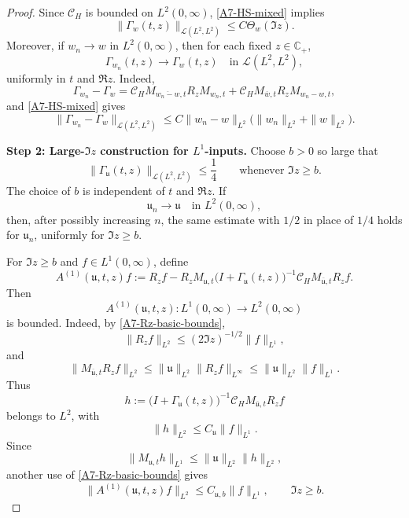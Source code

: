 \documentclass[10pt,a4paper]{amsart}
\begin{document}
\begin{proof}
Since \(\mathcal C_H\) is bounded on \(L^2(0,\infty)\), \eqref{A7-HS-mixed}
implies
\begin{equation}
\label{A7-Gamma-HS-bound}
\|\Gamma_w(t,z)\|_{\mathcal L(L^2,L^2)}
\le
C\Theta_w(\Im z).
\end{equation}
Moreover, if \(w_n\to w\) in \(L^2(0,\infty)\), then for each fixed
\(z\in\mathbb C_+\),
\begin{equation}
\label{A7-Gamma-L2-continuity}
\Gamma_{w_n}(t,z)\to\Gamma_w(t,z)
\quad\text{in }\mathcal L(L^2,L^2),
\end{equation}
uniformly in \(t\) and \(\Re z\). Indeed,
\[
\Gamma_{w_n}-\Gamma_w
=
\mathcal C_HM_{\overline{w_n-w},t}R_zM_{w_n,t}
+
\mathcal C_HM_{\overline w,t}R_zM_{w_n-w,t},
\]
and \eqref{A7-HS-mixed} gives
\[
\|\Gamma_{w_n}-\Gamma_w\|_{\mathcal L(L^2,L^2)}
\le
C\|w_n-w\|_{L^2}
\bigl(\|w_n\|_{L^2}+\|w\|_{L^2}\bigr).
\]

\medskip
\noindent
\textbf{Step 2: Large-\(\Im z\) construction for \(L^1\)-inputs.}
Choose \(b>0\) so large that
\begin{equation}
\label{A7-large-im-smallness}
\|\Gamma_{\mathfrak u}(t,z)\|_{\mathcal L(L^2,L^2)}
\le
\frac14
\qquad
\text{whenever }\Im z\ge b.
\end{equation}
The choice of \(b\) is independent of \(t\) and \(\Re z\). If
\[
\mathfrak u_n\to\mathfrak u
\quad\text{in }L^2(0,\infty),
\]
then, after possibly increasing \(n\), the same estimate with \(1/2\) in place
of \(1/4\) holds for \(\mathfrak u_n\), uniformly for \(\Im z\ge b\).

For \(\Im z\ge b\) and \(f\in L^1(0,\infty)\), define
\begin{equation}
\label{A7-A1-large-def}
A^{(1)}(\mathfrak u,t,z)f
:=
R_zf
-
R_zM_{\mathfrak u,t}
\bigl(I+\Gamma_{\mathfrak u}(t,z)\bigr)^{-1}
\mathcal C_HM_{\overline{\mathfrak u},t}R_zf .
\end{equation}
Then
\[
A^{(1)}(\mathfrak u,t,z):L^1(0,\infty)\to L^2(0,\infty)
\]
is bounded. Indeed, by \eqref{A7-Rz-basic-bounds},
\[
\|R_zf\|_{L^2}\le (2\Im z)^{-1/2}\|f\|_{L^1},
\]
and
\[
\|M_{\overline{\mathfrak u},t}R_zf\|_{L^2}
\le
\|\mathfrak u\|_{L^2}\|R_zf\|_{L^\infty}
\le
\|\mathfrak u\|_{L^2}\|f\|_{L^1}.
\]
Thus
\[
h:=
\bigl(I+\Gamma_{\mathfrak u}(t,z)\bigr)^{-1}
\mathcal C_HM_{\overline{\mathfrak u},t}R_zf
\]
belongs to \(L^2\), with
\[
\|h\|_{L^2}\le C_{\mathfrak u}\|f\|_{L^1}.
\]
Since
\[
\|M_{\mathfrak u,t}h\|_{L^1}
\le
\|\mathfrak u\|_{L^2}\|h\|_{L^2},
\]
another use of \eqref{A7-Rz-basic-bounds} gives
\begin{equation}
\label{A7-A1-large-bound}
\|A^{(1)}(\mathfrak u,t,z)f\|_{L^2}
\le
C_{\mathfrak u,b}\|f\|_{L^1},
\qquad \Im z\ge b.
\end{equation}


\end{proof}
\end{document}
